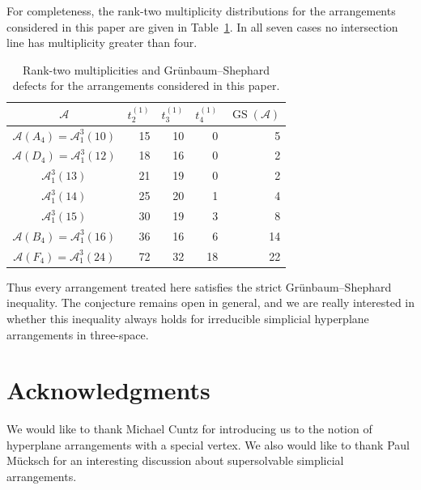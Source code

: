 \documentclass[11pt]{article}
\theoremstyle{definition}
\theoremstyle{remark}
\newcommand{\cA}{\mathcal A}
\begin{document}
For completeness, the rank-two multiplicity distributions for the
arrangements considered in this paper are given in
Table~\ref{tab:GS-defects}.  In all seven cases no intersection line has
multiplicity greater than four.

\begin{table}[ht]
\centering
\renewcommand{\arraystretch}{1.12}
\begin{tabular}{c|r|r|r|r}
\toprule
$\cA$ & $t_2^{(1)}$ & $t_3^{(1)}$ & $t_4^{(1)}$ &
$\operatorname{GS}(\cA)$\\
\midrule
$\cA(A_4)=\cA^3_1(10)$&15&10&0&5\\
$\cA(D_4)=\cA^3_1(12)$&18&16&0&2\\
$\cA^3_1(13)$&21&19&0&2\\
$\cA^3_1(14)$&25&20&1&4\\
$\cA^3_1(15)$&30&19&3&8\\
$\cA(B_4)=\cA^3_1(16)$&36&16&6&14\\
$\cA(F_4)=\cA^3_1(24)$&72&32&18&22\\
\bottomrule
\end{tabular}
\caption{Rank-two multiplicities and Gr\"unbaum--Shephard defects for the
arrangements considered in this paper.}
\label{tab:GS-defects}
\end{table}

Thus every arrangement treated here satisfies the strict Grünbaum--Shephard inequality. The conjecture remains open in general, and we are really interested in whether this inequality always holds for irreducible simplicial hyperplane arrangements in three-space.


\section*{Acknowledgments}
We would like to thank Michael Cuntz for introducing us to the notion of hyperplane arrangements with a special vertex. We also would like to thank Paul M\"ucksch for an interesting discussion about supersolvable simplicial arrangements.
\end{document}
